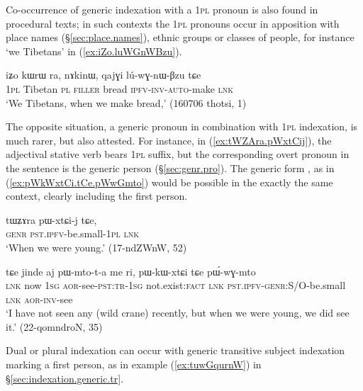 Co-occurrence of generic indexation with a \textsc{1pl} pronoun is also found in procedural texts; in such contexts the  \textsc{1pl} pronouns occur in apposition with place names (§\ref{sec:place.names}), ethnic groups or classes of people, for instance  `we Tibetans' in (\ref{ex:iZo.luWGnWBzu}).

\begin{exe}
\ex   \label{ex:iZo.luWGnWBzu}
 \gll iʑo kɯrɯ ra, nɤkinɯ, qajɣi lú-wɣ-nɯ-βzu tɕe \\
\textsc{1pl} Tibetan \textsc{pl} \textsc{filler} bread \textsc{ipfv}-\textsc{inv}-\textsc{auto}-make \textsc{lnk} \\
\glt `We Tibetans, when we make bread,' (160706 thotsi, 1)
\end{exe}

The opposite situation, a generic pronoun in combination with \textsc{1pl} indexation, is much rarer, but also attested. For instance, in (\ref{ex:tWZAra.pWxtCij}), the adjectival stative verb  bears \textsc{1pl}  suffix, but the corresponding overt pronoun in the sentence is the generic person  (§\ref{sec:genr.pro}). The generic form , as in (\ref{ex:pWkWxtCi.tCe.pWwGmto}) would be possible in the exactly the same context, clearly including the first person.

\begin{exe}
\ex   \label{ex:tWZAra.pWxtCij}
 \gll tɯʑɤra pɯ-xtɕi-j tɕe, \\
 \textsc{genr} \textsc{pst}.\textsc{ipfv}-be.small-\textsc{1pl} \textsc{lnk} \\
 \glt `When we were young.' (17-ndZWnW, 52)
\end{exe}

\begin{exe}
\ex   \label{ex:pWkWxtCi.tCe.pWwGmto}
 \gll tɕe jinde aj pɯ-mto-t-a me ri, pɯ-kɯ-xtɕi tɕe pɯ́-wɣ-mto \\
 \textsc{lnk} now \textsc{1sg} \textsc{aor}-see-\textsc{pst}:\textsc{tr}-\textsc{1sg} not.exist:\textsc{fact} \textsc{lnk} \textsc{pst}.\textsc{ipfv}-\textsc{genr}:S/O-be.small \textsc{lnk} \textsc{aor}-\textsc{inv}-see \\
\glt `I have not seen any (wild crane) recently, but when we were young, we did see it.' (22-qomndroN, 35)
\end{exe}

Dual or plural indexation can occur with generic transitive subject indexation marking a first person, as in example (\ref{ex:tuwGqurnW}) in §\ref{sec:indexation.generic.tr}.

